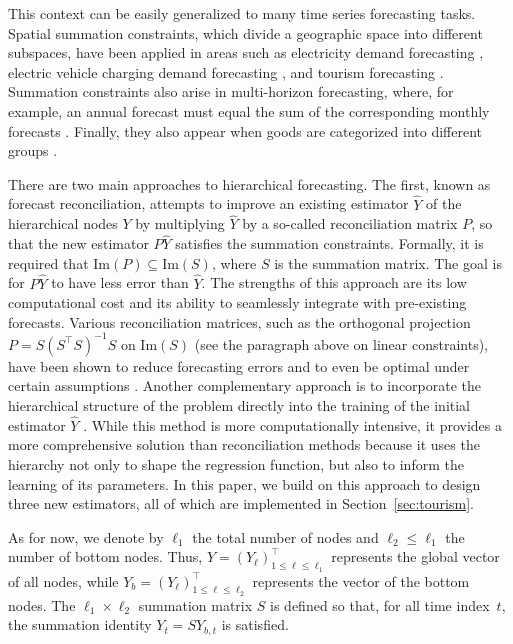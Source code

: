 This context can be easily generalized to many time series forecasting tasks. Spatial summation constraints, which divide a geographic space into different subspaces, have been applied in areas such as electricity demand forecasting \citep{bregere2022online}, electric vehicle charging demand forecasting \citep{amara-ouali2024forecasting}, and tourism forecasting \citep{Wickramasuriya2019optimal}.
Summation constraints also arise in multi-horizon forecasting, where, for example, an annual forecast must equal the sum of the corresponding monthly forecasts \citep{kourentzes2019cross}.
Finally, they also appear when goods are categorized into different groups \citep{pennings2017integrated}.

There are two main approaches to hierarchical forecasting. The first, known as forecast reconciliation, attempts to improve an existing estimator $\hat{Y}$ of the hierarchical nodes $Y$ by multiplying $\hat{Y}$ by a so-called reconciliation matrix $P$, so that the new estimator $P \hat Y$ satisfies the summation constraints. 
Formally, it is required that $\mathrm{Im}(P) \subseteq \mathrm{Im}(S)$, where $S$ is the summation matrix. 
The goal is for $P\hat{Y}$ to have less error than $\hat{Y}$. 
The strengths of this approach are its low computational cost and its ability to seamlessly integrate with pre-existing forecasts. 
Various reconciliation matrices, such as the orthogonal projection $P = S(S^\top S)^{-1}S$ on $\mathrm{Im}(S)$ (see the paragraph above on linear constraints), have been shown to reduce forecasting errors and to even be optimal under certain assumptions 
\citep{Wickramasuriya2019optimal}. Another complementary approach is to incorporate the hierarchical structure of the problem directly into the training of the initial estimator $\hat{Y}$ 
\citep{rangapuram21end}.
While this method is more computationally intensive, it provides a more comprehensive solution than reconciliation methods because it uses the hierarchy not only to shape the regression function, but also to inform the learning of its parameters. In this paper, we build on this approach to design three new estimators, all of which are implemented in Section~\ref{sec:tourism}.

As for now, we denote by $\ell_1$ the total number of nodes and $\ell_2 \leq \ell_1$ the number of bottom nodes. Thus, $Y=(Y_{\ell})_{1\leq \ell \leq \ell_1}^\top$ represents the global vector of all nodes, while $Y_b=(Y_{\ell})_{1\leq \ell \leq \ell_2}^\top$ represents the vector of the bottom nodes.
The $\ell_1 \times \ell_2$ summation matrix $S$ is defined so that, for all time index~$t$, the summation identity $Y_t = S Y_{b,t}$ is satisfied. 

